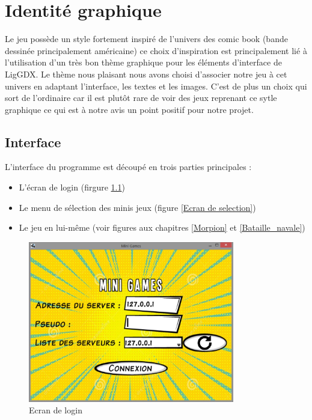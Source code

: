 \documentclass{report}
\begin{document}
\chapter{Identité graphique}
Le jeu possède un style fortement inspiré de l'univers des comic book (bande dessinée principalement américaine)
ce choix d'inspiration est principalement lié à l'utilisation d'un très bon thème graphique pour les éléments
d'interface de LigGDX. Le thème nous plaisant nous avons choisi d'associer notre jeu à cet univers en adaptant l'interface, les
textes et les images. C'est de plus un choix qui sort de l'ordinaire car il est plutôt rare de voir des jeux
reprenant ce sytle graphique ce qui est à notre avis un point positif pour notre projet.

\section{Interface}
L'interface du programme est découpé en trois parties principales :

\begin{itemize}
  \item L'écran de login (firgure \ref{Ecran de login})
  \item Le menu de sélection des minis jeux (figure \ref{Ecran de selection})
  \item Le jeu en lui-même (voir figures aux chapitres \ref{Morpion} et \ref{Bataille_navale})
\end{itemize}

\begin{figure}[H]
	\centering\includegraphics[width=9cm]{loginScreen}
	\caption{Ecran de login}
	\label{Ecran de login}
\end{figure}
\end{document}
